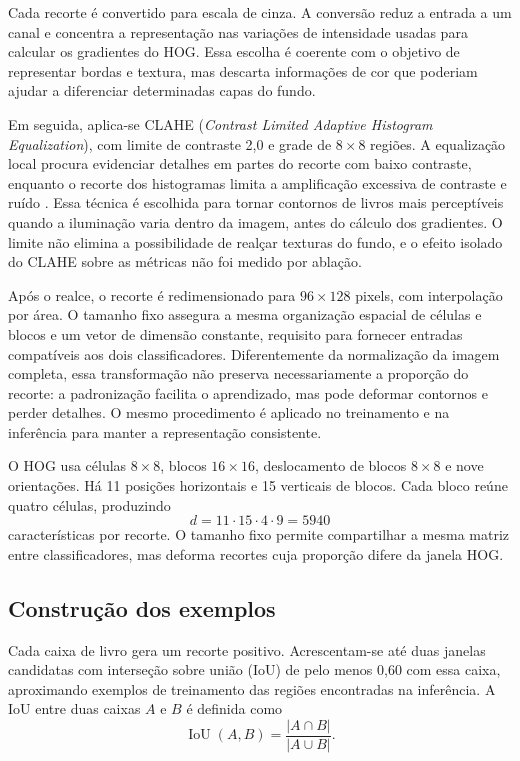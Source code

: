 \documentclass[12pt,a4paper,twocolumn]{article}
\begin{document}
Cada recorte é convertido para escala de cinza. A conversão reduz a entrada a um canal e concentra a representação nas variações de intensidade usadas para calcular os gradientes do HOG. Essa escolha é coerente com o objetivo de representar bordas e textura, mas descarta informações de cor que poderiam ajudar a diferenciar determinadas capas do fundo.

Em seguida, aplica-se CLAHE (\textit{Contrast Limited Adaptive Histogram Equalization}), com limite de contraste 2,0 e grade de $8\times8$ regiões. A equalização local procura evidenciar detalhes em partes do recorte com baixo contraste, enquanto o recorte dos histogramas limita a amplificação excessiva de contraste e ruído \cite{clahetutorial,opencvclahe}. Essa técnica é escolhida para tornar contornos de livros mais perceptíveis quando a iluminação varia dentro da imagem, antes do cálculo dos gradientes. O limite não elimina a possibilidade de realçar texturas do fundo, e o efeito isolado do CLAHE sobre as métricas não foi medido por ablação.

Após o realce, o recorte é redimensionado para $96\times128$ pixels, com interpolação por área. O tamanho fixo assegura a mesma organização espacial de células e blocos e um vetor de dimensão constante, requisito para fornecer entradas compatíveis aos dois classificadores. Diferentemente da normalização da imagem completa, essa transformação não preserva necessariamente a proporção do recorte: a padronização facilita o aprendizado, mas pode deformar contornos e perder detalhes. O mesmo procedimento é aplicado no treinamento e na inferência para manter a representação consistente.

O HOG usa células $8\times8$, blocos $16\times16$, deslocamento de blocos $8\times8$ e nove orientações. Há 11 posições horizontais e 15 verticais de blocos. Cada bloco reúne quatro células, produzindo
\begin{equation}
d=11\cdot15\cdot4\cdot9=5940
\end{equation}
características por recorte. O tamanho fixo permite compartilhar a mesma matriz entre classificadores, mas deforma recortes cuja proporção difere da janela HOG.

\subsection{Construção dos exemplos}
Cada caixa de livro gera um recorte positivo. Acrescentam-se até duas janelas candidatas com interseção sobre união (IoU) de pelo menos 0,60 com essa caixa, aproximando exemplos de treinamento das regiões encontradas na inferência. A IoU entre duas caixas $A$ e $B$ é definida como
\begin{equation}
\operatorname{IoU}(A,B)=\frac{|A\cap B|}{|A\cup B|}.
\end{equation}
\end{document}
